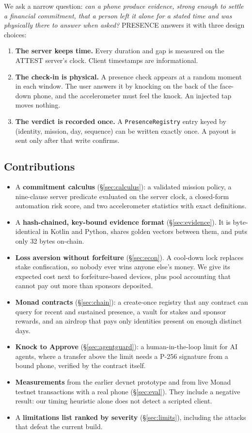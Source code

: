 \documentclass[10pt]{article}
\newcommand{\code}[1]{\texttt{\small #1}}
\begin{document}
We ask a narrow question: \emph{can a phone produce evidence, strong enough to settle a financial commitment, that a
person left it alone for a stated time and was physically there to answer when asked?} PRESENCE answers it with three
design choices:
\begin{enumerate}
\item \textbf{The server keeps time.} Every duration and gap is measured on the ATTEST server's clock. Client timestamps
are informational.
\item \textbf{The check-in is physical.} A presence check appears at a random moment in each window. The user answers it
by knocking on the back of the face-down phone, and the accelerometer must feel the knock. An injected tap moves nothing.
\item \textbf{The verdict is recorded once.} A \code{PresenceRegistry} entry keyed by (identity, mission, day, sequence)
can be written exactly once. A payout is sent only after that write confirms.
\end{enumerate}

\subsection{Contributions}
\begin{itemize}
\item A \textbf{commitment calculus} (\S\ref{sec:calculus}): a validated mission policy, a nine-clause server predicate
evaluated on the server clock, a closed-form automation risk score, and two accelerometer statistics with exact
definitions.
\item A \textbf{hash-chained, key-bound evidence format} (\S\ref{sec:evidence}). It is byte-identical in Kotlin and
Python, shares golden vectors between them, and puts only 32 bytes on-chain.
\item \textbf{Loss aversion without forfeiture} (\S\ref{sec:econ}). A cool-down lock replaces stake confiscation, so
nobody ever wins anyone else's money. We give its expected cost next to forfeiture-based devices, plus pool accounting
that cannot pay out more than sponsors deposited.
\item \textbf{Monad contracts} (\S\ref{sec:chain}): a create-once registry that any contract can query for recent and
sustained presence, a vault for stakes and sponsor rewards, and an airdrop that pays only identities present on enough
distinct days.
\item \textbf{Knock to Approve} (\S\ref{sec:agentguard}): a human-in-the-loop limit for AI agents, where a transfer above
the limit needs a P-256 signature from a bound phone, verified by the contract itself.
\item \textbf{Measurements} from the earlier devnet prototype and from live Monad testnet transactions with a real phone
(\S\ref{sec:eval}). They include a negative result: our timing heuristic alone does not detect a scripted client.
\item A \textbf{limitations list ranked by severity} (\S\ref{sec:limits}), including the attacks that defeat the
current build.
\end{itemize}
\end{document}

